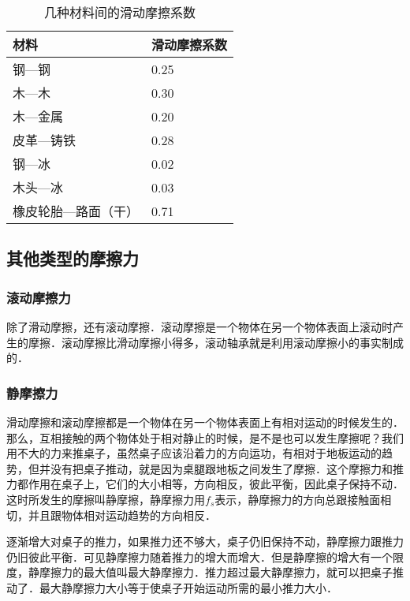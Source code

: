\begin{table}[H]
    \centering
    \caption{几种材料间的滑动摩擦系数}
    \begin{tabularx}{\textwidth}{MM}
        \toprule[1.5pt]
        材料         & 滑动摩擦系数 \\
        \midrule
        钢—钢        & 0.25   \\
        木—木        & 0.30   \\
        木—金属       & 0.20   \\
        皮革—铸铁      & 0.28   \\
        钢—冰        & 0.02   \\
        木头—冰       & 0.03   \\
        橡皮轮胎—路面（干） & 0.71   \\
        \bottomrule[1.5pt]
    \end{tabularx}
\end{table}

\subsection{其他类型的摩擦力}

\subsubsection{滚动摩擦力}

除了滑动摩擦，还有滚动摩擦．滚动摩擦是一个物体在另一个物体表面上滚动时产生的摩擦．滚动摩擦比滑动摩擦小得多，滚动轴承就是利用滚动摩擦小的事实制成的．


\subsubsection{静摩擦力}
滑动摩擦和滚动摩擦都是一个物体在另一个物体表面上有相对运动的时候发生的．那么，互相接触的两个物体处于相对静止的时候，是不是也可以发生摩擦呢？我们用不大的力来推桌子，虽然桌子应该沿着力的方向运功，有相对于地板运动的趋势，但并没有把桌子推动，就是因为桌腿跟地板之间发生了摩擦．这个摩擦力和推力都作用在桌子上，它们的大小相等，方向相反，彼此平衡，因此桌子保持不动．这时所发生的摩擦叫静摩擦，静摩擦力用$f_s$表示，静摩擦力的方向总跟接触面相切，并且跟物体相对运动趋势的方向相反．

逐渐增大对桌子的推力，如果推力还不够大，桌子仍旧保持不动，静摩擦力跟推力仍旧彼此平衡．可见静摩擦力随着推力的增大而增大．但是静摩擦的增大有一个限度，静摩擦力的最大值叫最大静摩擦力．推力超过最大静摩擦力，就可以把桌子推动了．最大静摩擦力大小等于使桌子开始运动所需的最小推力大小．

